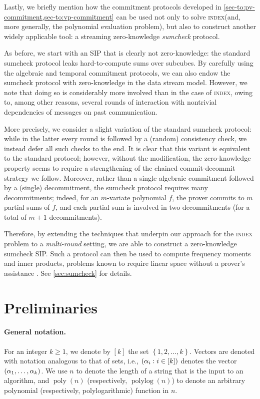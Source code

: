 \documentclass[a4paper,UKenglish,cleveref, autoref, thm-restate]{lipics-v2021}
\theoremstyle{definition}
\renewcommand{\set}[1]{\left\{#1\right\}}
\newcommand{\poly}{\operatorname{poly}}
\newcommand{\polylog}{\operatorname{polylog}}
\newcommand{\indexproblem}{\normalfont\textsc{index}\xspace}
\newcommand{\dimension}{m}
\def\fe#1{
    \ifnum#1=1
        \alpha
    \else
    \ifnum#1=2
        \beta
    \else
    \ifnum#1=3
        \gamma
    \fi\fi\fi
}
\begin{document}
    Lastly, we briefly mention how the commitment protocols developed in \cref{sec-to:pv-commitment,sec-to:vp-commitment} can be used not only to solve \indexproblem (and, more generally, the polynomial evaluation problem), but also to construct another widely applicable tool: a streaming zero-knowledge \emph{sumcheck} protocol.
    
    As before, we start with an SIP that is clearly not zero-knowledge: the standard sumcheck protocol leaks hard-to-compute sums over subcubes. By carefully using the algebraic and temporal commitment protocols, we can also endow the sumcheck protocol with zero-knowledge in the data stream model. However, we note that doing so is considerably more involved than in the case of \indexproblem, owing to, among other reasons, several rounds of interaction with nontrivial dependencies of messages on past communication.
    
    More precisely, we consider a slight variation of the standard sumcheck protocol: while in the latter every round is followed by a (random) consistency check, we instead defer all such checks to the end. It is clear that this variant is equivalent to the standard protocol; however, without the modification, the zero-knowledge property seems to require a strengthening of the chained commit-decommit strategy we follow. Moreover, rather than a single algebraic commitment followed by a (single) decommitment, the sumcheck protocol requires many decommitments; indeed, for an $\dimension$-variate polynomial $f$, the prover commits to $\dimension$ partial sums of $f$, and each partial sum is involved in two decommitments (for a total of $\dimension + 1$ decommitments).
    
    Therefore, by extending the techniques that underpin our approach for the \indexproblem problem to a \emph{multi-round} setting, we are able to construct a zero-knowledge sumcheck SIP. Such a protocol can then be used to  compute frequency moments and inner products, problems known to require linear space without a prover's assistance \cite{AMS99}. See \cref{sec:sumcheck} for details.

\section{Preliminaries}
\label{sec:preliminaries}

    \paragraph*{General notation\iflipics\else.\fi} For an integer $k \geq1$, we denote by $[k]$ the set $\set{1,2, \ldots, k}$. Vectors are denoted with notation analogous to that of sets, i.e., $(\fe1_i : i \in [k])$ denotes the vector $(\fe1_1, \ldots, \fe1_k)$. We use $n$ to denote the length of a string that is the input to an algorithm, and $\poly(n)$ (respectively, $\polylog(n)$) to denote an arbitrary polynomial (respectively, polylogarithmic) function in $n$.
    
\end{document}
